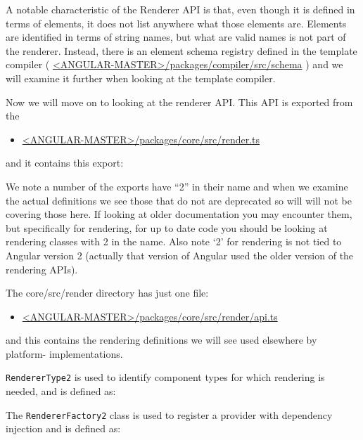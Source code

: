 A notable characteristic of the Renderer API is that, even though it is defined in terms
of elements, it does not list anywhere what those elements are. Elements are
identified in terms of string names, but what are valid names is not part of the
renderer. Instead, there is an element schema registry defined in the template
compiler (
\href{https://github.com/angular/angular/tree/master/packages/compiler/src/schema}
{<ANGULAR-MASTER>/packages/compiler/src/schema}
) and we will examine
it further when looking at the template compiler.

Now we will move on to looking at the renderer API. This API is exported from the

\begin{itemize}
  \item \href{https://github.com/angular/angular/blob/master/packages/core/src/render.ts}
        {<ANGULAR-MASTER>/packages/core/src/render.ts}
\end{itemize}

and it contains this export:



We note a number of the exports have “2” in their name and when we examine the
actual definitions we see those that do not are deprecated so will will not be covering
those here. If looking at older documentation you may encounter them, but
specifically for rendering, for up to date code you should be looking at rendering
classes with 2 in the name. Also note ‘2’ for rendering is not tied to Angular version 2
(actually that version of Angular used the older version of the rendering APIs).

The core/src/render directory has just one file:

\begin{itemize}
  \item \href{https://github.com/angular/angular/blob/master/packages/core/src/render/api.ts}
        {<ANGULAR-MASTER>/packages/core/src/render/api.ts}
\end{itemize}

and this contains the rendering definitions we will see used elsewhere by platform-
implementations.

\texttt{RendererType2}
is used to identify component types for which rendering is needed,
and is defined as:



The
\texttt{RendererFactory2}
class is used to register a provider with dependency injection
and is defined as:

